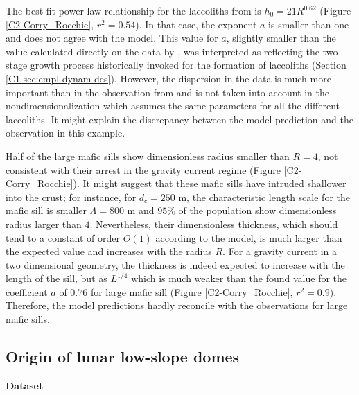 The  best  fit   power  law  relationship  for   the  laccoliths  from
\citet{E:2015tl}     is     $h_0     =    21     R^{0.62}$     (Figure
\ref{C2-Corry_Rocchie}, $r^2  =0.54$). In that case,  the exponent $a$
is smaller than one and does not agree with the model.  This value for
$a$, slightly smaller  than the value calculated directly  on the data
by  \citet{McCaffrey:1997ea},   was  interpreted  as   reflecting  the
two-stage  growth process  historically invoked  for the  formation of
laccoliths   (Section   \ref{C1-sec:empl-dynam-des}).   However,   the
dispersion in the data is much more important than in the observation from
\citet{Rocchi:2010dn} and is not taken into account in the
nondimensionalization which  assumes the  same parameters for  all the
different  laccoliths. It  might explain  the discrepancy  between the
model prediction and the observation in this example.

Half of the  large mafic sills show dimensionless  radius smaller than
$R=4$, not consistent with their  arrest in the gravity current regime
(Figure \ref{C2-Corry_Rocchie}).   It might  suggest that  these mafic
sills  have  intruded shallower  into  the  crust; for  instance,  for
$d_c=250$ m,  the characteristic  length scale for  the mafic  sill is
smaller   $\Lambda=800$  m   and   $95\%$  of   the  population   show
dimensionless   radius   larger   than   $4$.    Nevertheless,   their
dimensionless  thickness, which  should tend  to a  constant of  order
$O(1)$ according to the model, is  much larger than the expected value
and increases  with the radius  $R$.  For a  gravity current in  a two
dimensional  geometry, the  thickness is  indeed expected  to increase
with the length  of the sill, but  as $L^{1/4}$ \citet{Michaut:2011kg}
which is much  weaker than the found value for  the coefficient $a$ of
$0.76$   for   large   mafic  sill   (Figure   \ref{C2-Corry_Rocchie},
$r^2=0.9$).  Therefore,  the model predictions hardly  reconcile with
the observations for large mafic sills.

\subsection{Origin of lunar low-slope domes}
\label{C2-sec:observ-vs-pred}

\vspace{.5cm}\hspace{.5cm} \textbf{Dataset} \vspace{.5cm}

